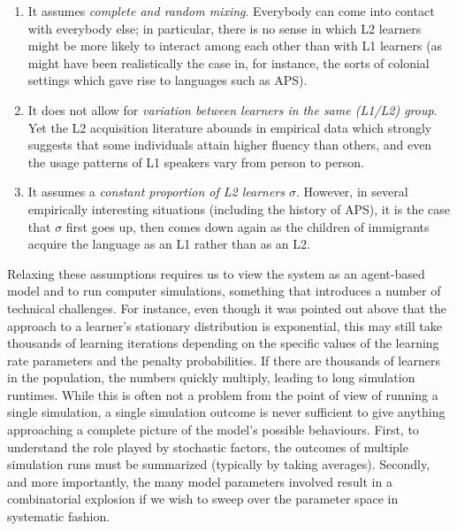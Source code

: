 \begin{enumerate}
\def\labelenumi{\arabic{enumi}.}
\tightlist
\item
  It assumes \emph{complete and random mixing}. Everybody can come into
  contact with everybody else; in particular, there is no sense in which
  L2 learners might be more likely to interact among each other than
  with L1 learners (as might have been realistically the case in, for
  instance, the sorts of colonial settings which gave rise to languages
  such as APS).
\item
  It does not allow for \emph{variation between learners in the same
  (L1/L2) group}. Yet the L2 acquisition literature abounds in empirical
  data which strongly suggests that some individuals attain higher
  fluency than others, and even the usage patterns of L1 speakers vary
  from person to person.
\item
  It assumes a \emph{constant proportion of L2 learners \(\sigma\)}.
  However, in several empirically interesting situations (including the
  history of APS), it is the case that \(\sigma\) first goes up, then
  comes down again as the children of immigrants acquire the language as
  an L1 rather than as an L2.
\end{enumerate}

Relaxing these assumptions requires us to view the system as an
agent-based model \autocite{Gilbert2020,Smaldino2023} and to run
computer simulations, something that introduces a number of technical
challenges. For instance, even though it was pointed out above that the
approach to a learner's stationary distribution is exponential, this may
still take thousands of learning iterations depending on the specific
values of the learning rate parameters and the penalty probabilities. If
there are thousands of learners in the population, the numbers quickly
multiply, leading to long simulation runtimes. While this is often not a
problem from the point of view of running a single simulation, a single
simulation outcome is never sufficient to give anything approaching a
complete picture of the model's possible behaviours. First, to
understand the role played by stochastic factors, the outcomes of
multiple simulation runs must be summarized (typically by taking
averages). Secondly, and more importantly, the many model parameters
involved result in a combinatorial explosion if we wish to sweep over
the parameter space in systematic fashion.


